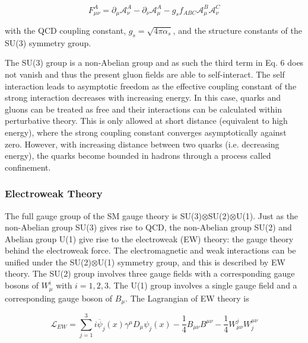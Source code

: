 \documentclass[12pt,a4paper,epsf,portrait,times,epsfig]{report}
\begin{document}
		\begin{center}
			\begin{equation}
				F_{\mu\nu}^{A} = \partial_{\mu}\mathcal{A}_{\nu}^{A}-\partial_{\nu}\mathcal{A}_{\mu}^{A}-g_{s}f_{ABC}\mathcal{A}_{\mu}^{B}\mathcal{A}_{\nu}^{C}
			\end{equation}
		\end{center}
		
		with the QCD coupling constant, $g_{s} = \sqrt{4\pi\alpha_{s}}$, and the structure constants of the SU(3) symmetry group. \par 
		The SU(3) group is a non-Abelian group and as such the third term in Eq. 6 does not vanish and thus the present gluon fields are able to self-interact. The self interaction leads to asymptotic freedom as the effective coupling constant of the strong interaction decreases with increasing energy. In this case, quarks and gluons can be treated as free and their interactions can be calculated within perturbative theory. This is only allowed at short distance (equivalent to high energy), where the strong coupling constant converges asymptotically against zero. However, with increasing distance between two quarks (i.e. decreasing energy), the quarks become bounded in hadrons through a process called confinement.
		
		\subsubsection{Electroweak Theory} 
		
		The full gauge group of the SM gauge theory is SU(3)$\otimes$SU(2)$\otimes$U(1). Just as the non-Abelian group SU(3) gives rise to QCD, the non-Abelian group SU(2) and Abelian group U(1) give rise to the electroweak (EW) theory: the gauge theory behind the electroweak force. The electromagnetic and weak interactions can be unified under the SU(2)$\otimes$U(1) symmetry group, and this is described by EW theory. The SU(2) group involves three gauge fields with a corresponding gauge bosons of $W_{\mu}^{i}$ with $i = 1, 2, 3$. The U(1) group involves a single gauge field and a corresponding gauge boson of $B_{\mu}$. The Lagrangian of EW theory is
		
		\begin{center}
			\begin{equation}
				\mathcal{L}_{EW} = \sum_{j=1}^{3}i\overline{\psi}_{j}(x)\gamma^{\mu}D_{\mu}\psi_{j}(x)-\frac{1}{4}B_{\mu\nu}B^{\mu\nu}-\frac{1}{4}W_{\mu\nu}^{j}W_{j}^{\mu\nu}
			\end{equation}
		\end{center}
		
\end{document}

